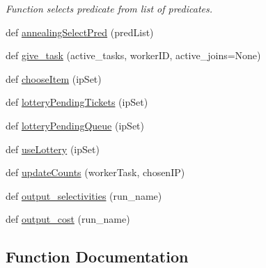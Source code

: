 \begin{DoxyCompactItemize}
\begin{DoxyCompactList}\small\item\em Function selects predicate from list of predicates. \end{DoxyCompactList}\item 
def \hyperlink{namespacedynamicfilterapp_1_1views__helpers_a20d80f9f863820e348c0246b76e047c8}{annealing\+Select\+Pred} (pred\+List)
\item 
def \hyperlink{namespacedynamicfilterapp_1_1views__helpers_ae1724f8890647a7c5abb659a94496be3}{give\+\_\+task} (active\+\_\+tasks, worker\+ID, active\+\_\+joins=None)
\item 
def \hyperlink{namespacedynamicfilterapp_1_1views__helpers_ad1a6f030776f2f8bcaae48a4dda40665}{choose\+Item} (ip\+Set)
\item 
def \hyperlink{namespacedynamicfilterapp_1_1views__helpers_a0738b44c5100686a1e192f6a479f4079}{lottery\+Pending\+Tickets} (ip\+Set)
\item 
def \hyperlink{namespacedynamicfilterapp_1_1views__helpers_a426ae35faab4f6770841e95e8bdce591}{lottery\+Pending\+Queue} (ip\+Set)
\item 
def \hyperlink{namespacedynamicfilterapp_1_1views__helpers_ac70553a13de6691cab15abdda021c913}{use\+Lottery} (ip\+Set)
\item 
def \hyperlink{namespacedynamicfilterapp_1_1views__helpers_a57d6ebd6f2f99cba59b82eded490891f}{update\+Counts} (worker\+Task, chosen\+IP)
\item 
def \hyperlink{namespacedynamicfilterapp_1_1views__helpers_a28b75553c43cd75d039443c9fc2b6408}{output\+\_\+selectivities} (run\+\_\+name)
\item 
def \hyperlink{namespacedynamicfilterapp_1_1views__helpers_adc56ec55dcde832ccd85dfade3328264}{output\+\_\+cost} (run\+\_\+name)
\end{DoxyCompactItemize}


\subsection{Function Documentation}
\mbox{\label{namespacedynamicfilterapp_1_1views__helpers_ac0d019064d0a4dff3cd08f7ea4c4d560}} 
